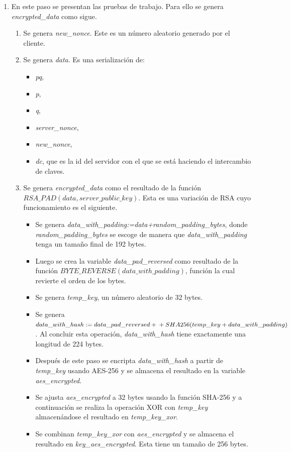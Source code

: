 \begin{enumerate}
	\item En este paso se presentan las pruebas de trabajo. Para ello se genera \emph{encrypted\_data} como sigue.
	\begin{enumerate}
		\item Se genera \emph{new\_nonce}. Este es un número aleatorio generado por el cliente.
		\item Se genera \emph{data}. Es una serialización de:
		\begin{itemize}
			\item \emph{pq},
			\item \emph{p},
			\item \emph{q},
			\item \emph{server\_nonce},
			\item \emph{new\_nonce},
			\item \emph{dc}, que es la id del servidor con el que se está haciendo el intercambio de claves.
		\end{itemize}
		\item Se genera \emph{encrypted\_data} como el resultado de la función $RSA\_PAD(data, server\_public\_key)$. Esta es una variación de RSA cuyo funcionamiento es el siguiente.
		\begin{itemize}
			\item Se genera \emph{data\_with\_padding:=data+random\_padding\_bytes}, donde \emph{random\_padding\_bytes} se escoge de manera que \emph{data\_with\_padding} tenga un tamaño final de 192 bytes.
			\item Luego se crea la variable \emph{data\_pad\_reversed} como resultado de la función $BYTE\_REVERSE(data\_with\_padding)$, función la cual revierte el orden de los bytes.
			\item Se genera \emph{temp\_key}, un número aleatorio de 32 bytes.
			\item Se genera $data\_with\_hash:=data\_pad\_reversed + \\ + SHA256(temp\_key + data\_with\_padding)$. Al concluir esta operación, \emph{data\_with\_hash} tiene exactamente una longitud de 224 bytes.
			\item Después de este paso se encripta \emph{data\_with\_hash} a partir de \emph{temp\_key} usando AES-256 y se almacena el resultado en la variable \emph{aes\_encrypted}.
			\item Se ajusta \emph{aes\_encrypted} a 32 bytes usando la función SHA-256 y a continuación se realiza la operación XOR con \emph{temp\_key} almacenándose el resultado en \emph{temp\_key\_xor}.
			\item Se combinan \emph{temp\_key\_xor} con \emph{aes\_encrypted} y se almacena el resultado en \emph{key\_aes\_encrypted}. Esta tiene un tamaño de 256 bytes. 

\end{itemize}
\end{enumerate}
\end{enumerate}
